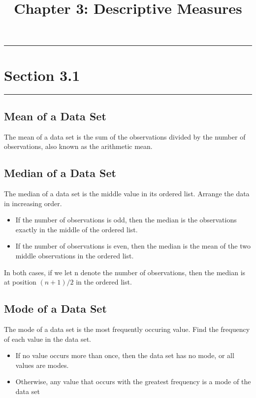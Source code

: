 \documentclass[12pt]{article}
\title{Chapter 3: Descriptive Measures}
\author{}
\begin{document}
    \maketitle
    \noindent\rule{\textwidth}{0.4pt}
    \section*{Section 3.1}
    \noindent\rule{\textwidth}{0.4pt}
        \subsection*{Mean of a Data Set}
            The mean of a data set is the sum of the observations divided by the number of
            observations, also known as the arithmetic mean.
        \subsection*{Median of a Data Set}
            The median of a data set is the middle value in its ordered list.
            Arrange the data in increasing order.
            \begin{itemize}
                \item If the number of observations is odd, then the 
                median is the observations exactly in the middle of the ordered list.
                \item If the number of observations is even, then the median is the
                mean of the two middle observations in the ordered list.
            \end{itemize}
            In both cases, if we let n denote the number of observations, then the
            median is at position \((n+1)/2\) in the ordered list.
        \subsection*{Mode of a Data Set}
            The mode of a data set is the most frequently occuring value.
                Find the frequency of each value in the data set.
                \begin{itemize}
                    \item If no value occurs more than once, then the data set has no mode,
                    or all values are modes.
                    \item Otherwise, any value that occurs with the greatest frequency is a
                    mode of the data set
                \end{itemize}
\end{document}
